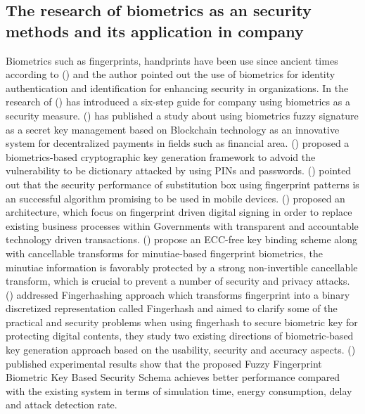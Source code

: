 \documentclass[graybox]{svmult}
\begin{document}
\subsection{The research of biometrics as an security methods and its application in company}
Biometrics such as fingerprints, handprints have been use since ancient times according to \citeauthor{gupta2008biometrics} (\citeyear{gupta2008biometrics}) and the author pointed out the use of biometrics for identity authentication and identification for enhancing security in organizations.
In the research of \citeauthor{bidgoli2012introduction}(\citeyear{bidgoli2012introduction}) has introduced a six-step guide for company using biometrics as a security measure.
\citeauthor{naganuma2020new} (\citeyear{naganuma2020new}) has published a study about using biometrics fuzzy signature as a secret key management based on Blockchain technology as an innovative system for decentralized payments in fields such as financial area.
\citeauthor{chang2004biometrics} (\citeyear{chang2004biometrics}) proposed a biometrics-based cryptographic key generation framework to advoid the vulnerability to be dictionary attacked by using PINs and passwords.
\citeauthor{sengel2020efficient} (\citeyear{sengel2020efficient}) pointed out that the security performance of substitution box using fingerprint patterns is an successful algorithm promising to be used in mobile devices.
\citeauthor{dhir2019uidba} (\citeyear{dhir2019uidba}) proposed an architecture, which focus on fingerprint driven digital signing in order to replace existing business processes within Governments with transparent and accountable technology driven transactions.
\citeauthor{jin2016biometric} (\citeyear{jin2016biometric}) propose an ECC-free key binding scheme along with cancellable transforms for minutiae-based fingerprint biometrics, the minutiae information is favorably protected by a strong non-invertible cancellable transform, which is crucial to prevent a number of security and privacy attacks.
\citeauthor{song2007personalized} (\citeyear{song2007personalized}) addressed Fingerhashing approach which transforms fingerprint into a binary discretized representation called Fingerhash and aimed to clarify some of the practical and security problems when using fingerhash to secure biometric key for protecting digital contents, they study two existing directions of biometric‐based key generation approach based on the usability, security and accuracy aspects.
\citeauthor{nivedetha2020ffbks} (\citeyear{nivedetha2020ffbks}) published  experimental results show that the proposed Fuzzy Fingerprint Biometric Key Based Security Schema achieves better performance compared with the existing system in terms of simulation time, energy consumption, delay and attack detection rate.
\end{document}
